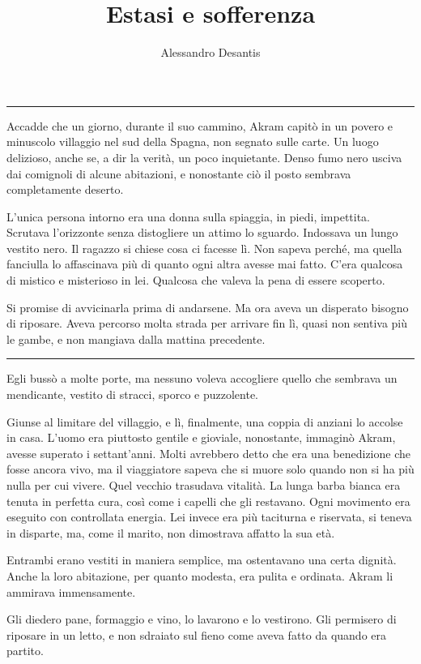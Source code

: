 \documentclass[a4paper,11pt,oneside,openright,final]{memoir}
\title{Estasi e sofferenza}
\author{Alessandro Desantis}
\makeatletter
\renewcommand{\maketitle}{\begin{titlingpage}%
    \let\footnotesize\small
    \let\footnoterule\relax
    \parindent \z@
    \reset@font
    \null\vfil
    \begin{flushleft}
      \huge \@title
    \end{flushleft}
    \par
    \hrule height 1pt
    \par
    \begin{flushright}
      \LARGE \@author \par
    \end{flushright}
    \vskip 60\p@
    \vfil\null
  \end{titlingpage}%
  \setcounter{footnote}{0}%
}
\makeatother
\begin{document}
\maketitle

Accadde che un giorno, durante il suo cammino, Akram capitò in un povero e
minuscolo villaggio nel sud della Spagna, non segnato sulle carte. Un luogo
delizioso, anche se, a dir la verità, un poco inquietante. Denso fumo nero
usciva dai comignoli di alcune abitazioni, e nonostante ciò il posto sembrava
completamente deserto.

L'unica persona intorno era una donna sulla spiaggia, in piedi, impettita.
Scrutava l'orizzonte senza distogliere un attimo lo sguardo. Indossava un lungo
vestito nero. Il ragazzo si chiese cosa ci facesse lì. Non sapeva perché, ma
quella fanciulla lo affascinava più di quanto ogni altra avesse mai fatto.
C'era qualcosa di mistico e misterioso in lei. Qualcosa che valeva la pena di
essere scoperto.

Si promise di avvicinarla prima di andarsene. Ma ora aveva un disperato bisogno
di riposare. Aveva percorso molta strada per arrivare fin lì, quasi non sentiva
più le gambe, e non mangiava dalla mattina precedente.

\plainbreak{1}

Egli bussò a molte porte, ma nessuno voleva accogliere quello che sembrava un
mendicante, vestito di stracci, sporco e puzzolente.

Giunse al limitare del villaggio, e lì, finalmente, una coppia di anziani lo
accolse in casa. L'uomo era piuttosto gentile e gioviale, nonostante, immaginò
Akram, avesse superato i settant'anni. Molti avrebbero detto che era una
benedizione che fosse ancora vivo, ma il viaggiatore sapeva che si muore solo
quando non si ha più nulla per cui vivere. Quel vecchio trasudava vitalità. La
lunga barba bianca era tenuta in perfetta cura, così come i capelli che gli
restavano. Ogni movimento era eseguito con controllata energia. Lei invece era
più taciturna e riservata, si teneva in disparte, ma, come il marito, non
dimostrava affatto la sua età.

Entrambi erano vestiti in maniera semplice, ma ostentavano una certa dignità.
Anche la loro abitazione, per quanto modesta, era pulita e ordinata. Akram li
ammirava immensamente.

Gli diedero pane, formaggio e vino, lo lavarono e lo vestirono. Gli permisero di
riposare in un letto, e non sdraiato sul fieno come aveva fatto da quando era
partito.
\end{document}
